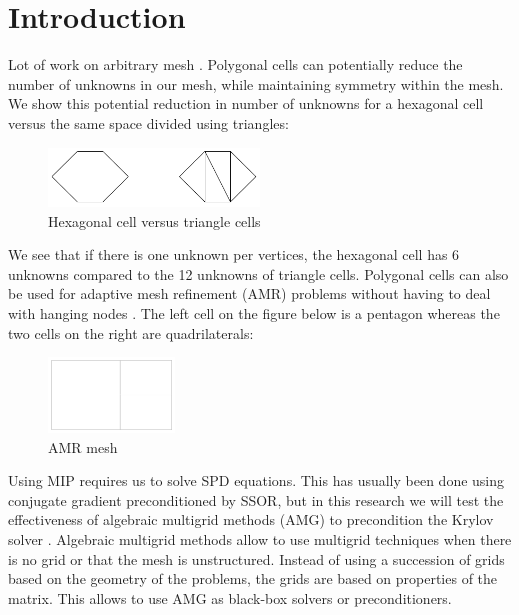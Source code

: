 \section{Introduction}
Lot of work on arbitrary mesh
\cite{palmer_ane,palmer_proc,palmer_fe,wachspress,cell_centered_diff,mimetic}. 
Polygonal cells can potentially reduce the number of unknowns in 
our mesh, while maintaining symmetry within the mesh. We show this potential 
reduction in number of unknowns for a hexagonal cell versus the same space divided 
using triangles:
\begin{figure}[H]
\centering
\includegraphics[width=0.5\textwidth]{hex_tri_cells}
\caption{Hexagonal cell versus triangle cells}
\end{figure}
We see that if there is one unknown per vertices, the hexagonal cell has 6
unknowns compared to the 12 unknowns of triangle cells. Polygonal cells can
also be used for adaptive mesh refinement (AMR) problems without having to
deal with hanging nodes \cite{arbitrary_hanging_nodes,dealII_hanging_nodes,
locally_hanging_nodes}. The left cell on the figure below is a pentagon whereas 
the two cells on the right are quadrilaterals:
\begin{figure}[H]
\centering
\includegraphics[width=0.3\textwidth]{amr}
\caption{AMR mesh}
\end{figure}
Using MIP requires us to solve SPD equations. This has usually been done using 
conjugate gradient preconditioned by SSOR, but in this research we will test the 
effectiveness of algebraic multigrid methods (AMG) to precondition the Krylov solver 
\cite{amg,amg_course}. Algebraic multigrid methods allow to use multigrid
techniques when there is no grid or that the mesh is unstructured. Instead of
using a succession of grids based on the geometry of the problems, the grids
are based on properties of the matrix. This allows to use AMG as black-box
solvers or preconditioners.
